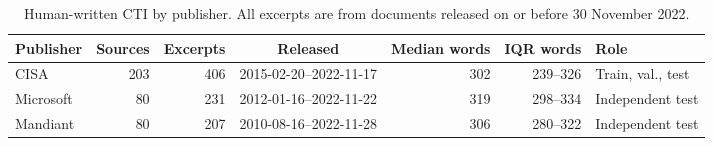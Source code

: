 \begin{table}[t]
\centering
\footnotesize
\caption{Human-written CTI by publisher. All excerpts are from documents released on or before 30 November 2022.}
\label{tab:external}
\begin{tabular}{lrrcrrl}
\toprule
Publisher & Sources & Excerpts & Released & Median words & IQR words & Role \\
\midrule
CISA & 203 & 406 & 2015-02-20--2022-11-17 & 302 & 239--326 & Train, val., test \\
Microsoft & 80 & 231 & 2012-01-16--2022-11-22 & 319 & 298--334 & Independent test \\
Mandiant & 80 & 207 & 2010-08-16--2022-11-28 & 306 & 280--322 & Independent test \\
\bottomrule
\end{tabular}
\end{table}
